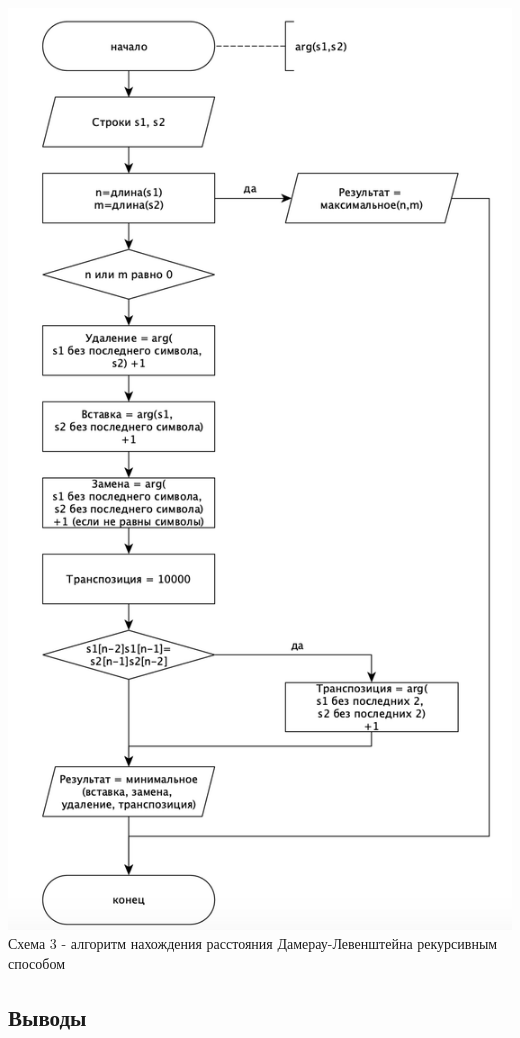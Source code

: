 \documentclass[a4paper,14pt]{article} %
\begin{document}
	\begin{center}
        		\includegraphics[scale = 1]{shema3} \\ Схема  3 - алгоритм нахождения расстояния Дамерау-Левенштейна рекурсивным способом
	\end{center}	
	
	\subsection{Выводы}
	\hfill
	
\end{document}
